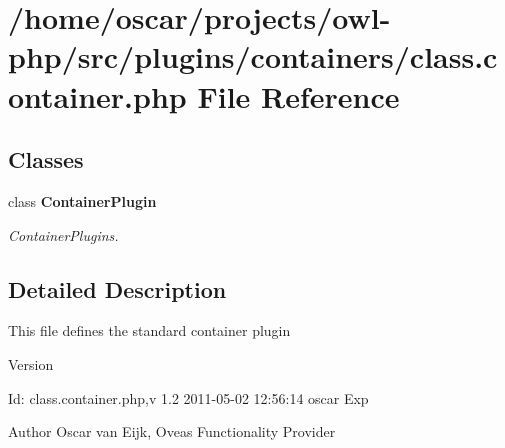 \section{/home/oscar/projects/owl-\/php/src/plugins/containers/class.container.php File Reference}
\label{plugins_2containers_2class_8container_8php}
\subsection*{Classes}
\begin{DoxyCompactItemize}
\item 
class {\bf ContainerPlugin}
\begin{DoxyCompactList}\small\item\em ContainerPlugins. \end{DoxyCompactList}\end{DoxyCompactItemize}


\subsection{Detailed Description}
This file defines the standard container plugin \begin{DoxyVersion}{Version}

\end{DoxyVersion}
\begin{DoxyParagraph}{Id:}
class.container.php,v 1.2 2011-\/05-\/02 12:56:14 oscar Exp 
\end{DoxyParagraph}
\begin{DoxyAuthor}{Author}
Oscar van Eijk, Oveas Functionality Provider 
\end{DoxyAuthor}
